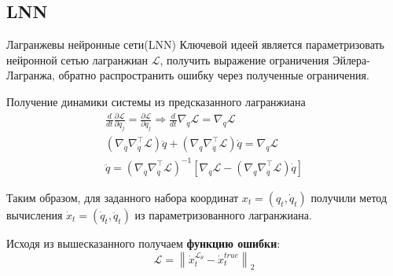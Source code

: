 \documentclass[12pt]{article}
\begin{document}
	\subsection{LNN}
	Лагранжевы нейронные сети(LNN)
	Ключевой идеей является параметризовать нейронной сетью лагранжиан $\mathcal{L}$, получить выражение ограничения Эйлера-Лагранжа, обратно распространить ошибку через полученные ограничения.
	
	Получение динамики системы из предсказанного лагранжиана	
	$$
		\begin{aligned}
		\frac{d}{d t} \frac{\partial \mathcal{L}}{\partial \dot{q}_{j}} =\frac{\partial \mathcal{L}}{\partial q_{j}}  \Rightarrow \frac{d}{d t} \nabla_{\dot{q}} \mathcal{L} =\nabla_{q} \mathcal{L} \\
		\left(\nabla_{\dot{q}} \nabla_{\dot{q}}^{\top} \mathcal{L}\right) \ddot{q}+\left(\nabla_{q} \nabla_{\dot{q}}^{\top} \mathcal{L}\right) \dot{q} =\nabla_{q} \mathcal{L} \\
		\ddot{q} =\left(\nabla_{\dot{q}} \nabla_{\dot{q}}^{\top} \mathcal{L}\right)^{-1}\left[\nabla_{q} \mathcal{L}-\left(\nabla_{q} \nabla_{\dot{q}}^{\top} \mathcal{L}\right) \dot{q}\right]
		\end{aligned}
		$$
	
	Таким образом, для заданного набора координат $x_t = (q_t, \dot{q}_t)$ получили метод вычисления $\dot{x}_t = (\dot{q}_t, \ddot{q}_t)$ из параметризованного лагранжиана.
	 
	 Исходя из вышесказанного получаем \textbf{функцию ошибки}: $$\mathcal{L} = \left\|\dot{x}^{\mathcal{L_{\theta}}}_t -\dot{x}^{true}_t\right\|_{2}$$
\end{document}

